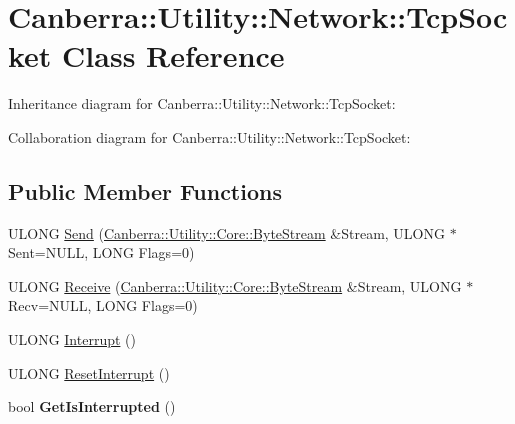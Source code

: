 \hypertarget{class_canberra_1_1_utility_1_1_network_1_1_tcp_socket}{}\section{Canberra\+:\+:Utility\+:\+:Network\+:\+:Tcp\+Socket Class Reference}
\label{class_canberra_1_1_utility_1_1_network_1_1_tcp_socket}


Inheritance diagram for Canberra\+:\+:Utility\+:\+:Network\+:\+:Tcp\+Socket\+:


Collaboration diagram for Canberra\+:\+:Utility\+:\+:Network\+:\+:Tcp\+Socket\+:
\subsection*{Public Member Functions}
\begin{DoxyCompactItemize}
\item 
U\+L\+O\+NG \hyperlink{class_canberra_1_1_utility_1_1_network_1_1_tcp_socket_abcf2b78614e6cb9853ae90c6b4d4be7c_abcf2b78614e6cb9853ae90c6b4d4be7c}{Send} (\hyperlink{class_canberra_1_1_utility_1_1_core_1_1_byte_stream}{Canberra\+::\+Utility\+::\+Core\+::\+Byte\+Stream} \&Stream, U\+L\+O\+NG $\ast$Sent=N\+U\+LL, L\+O\+NG Flags=0)
\item 
U\+L\+O\+NG \hyperlink{class_canberra_1_1_utility_1_1_network_1_1_tcp_socket_a9b8045e1d4ed56ea0df27956e2e0e025_a9b8045e1d4ed56ea0df27956e2e0e025}{Receive} (\hyperlink{class_canberra_1_1_utility_1_1_core_1_1_byte_stream}{Canberra\+::\+Utility\+::\+Core\+::\+Byte\+Stream} \&Stream, U\+L\+O\+NG $\ast$Recv=N\+U\+LL, L\+O\+NG Flags=0)
\item 
U\+L\+O\+NG \hyperlink{class_canberra_1_1_utility_1_1_network_1_1_tcp_socket_ad0329ac027d48c11de687d8bad972c0d_ad0329ac027d48c11de687d8bad972c0d}{Interrupt} ()
\item 
U\+L\+O\+NG \hyperlink{class_canberra_1_1_utility_1_1_network_1_1_tcp_socket_a558fbc89e7a2682ef3370bf8d3020764_a558fbc89e7a2682ef3370bf8d3020764}{Reset\+Interrupt} ()
\item 
\mbox{\label{class_canberra_1_1_utility_1_1_network_1_1_tcp_socket_a12fe6419529142cc358a5afe9cd267cd}} 
bool {\bfseries Get\+Is\+Interrupted} ()
\end{DoxyCompactItemize}

